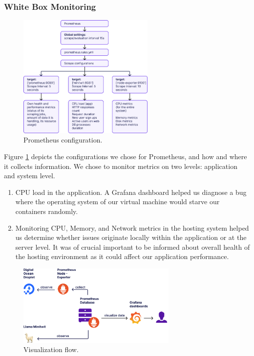 \documentclass{article}
\begin{document}
\subsubsection{White Box Monitoring}

\begin{figure}[ht]
    \centering
    \includegraphics[width=0.6\textwidth]{./images/prometheus_configuration_v2.png} 
    \caption{Prometheus configuration.}
    \label{fig:prometheus_configuration}
\end{figure}

Figure \ref{fig:prometheus_configuration} depicts the configurations we chose for Prometheus, and how and where it collects information. We chose to monitor metrics on two levels: application and system level.

\begin{enumerate}
    \item CPU load in the application. A Grafana dashboard helped us diagnose a bug where the operating system of our virtual machine would starve our containers randomly.
    \item Monitoring CPU, Memory, and Network metrics in the hosting system helped us determine whether issues originate locally within the application or at the server level. It was of crucial important to be informed about overall health of the hosting environment as it could affect our application performance.
\end{enumerate}

\begin{figure}[ht]
    \centering
    \includegraphics[width=0.7\textwidth]{./images/flow_grafana_prometheus_v2.png} 
    \caption{Visualization flow.}
    \label{fig:visualization_flow}
\end{figure}
\end{document}
